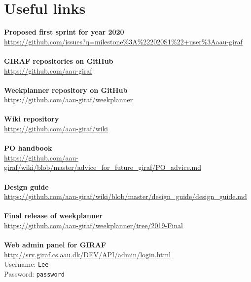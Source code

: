 \newpage
\chapter{Useful links}
\textbf{Proposed first sprint for year 2020} \\
\href{https://github.com/issues?q=milestone%3A%222020S1%22+user%3Aaau-giraf}{https://github.com/issues?q=milestone\%3A\%222020S1\%22+user\%3Aaau-giraf}
\\\\
\textbf{GIRAF repositories on GitHub} \\
\href{https://github.com/aau-giraf}{https://github.com/aau-giraf}
\\\\
\textbf{Weekplanner repository on GitHub} \\
\href{https://github.com/aau-giraf/weekplanner}{https://github.com/aau-giraf/weekplanner}
\\\\
\textbf{Wiki repository} \\
\href{https://github.com/aau-giraf/wiki}{https://github.com/aau-giraf/wiki}
\\\\
\textbf{PO handbook} \\
\href{https://github.com/aau-giraf/wiki/blob/master/advice_for_future_giraf/PO_advice.md}{https://github.com/aau-giraf/wiki/blob/master/advice\_for\_future\_giraf/PO\_advice.md}
\\\\
\textbf{Design guide} \\
\href{https://github.com/aau-giraf/wiki/blob/master/design_guide/design_guide.md}{https://github.com/aau-giraf/wiki/blob/master/design\_guide/design\_guide.md}
\\\\
\textbf{Final release of weekplanner} \\
\href{https://github.com/aau-giraf/weekplanner/tree/2019-Final}{https://github.com/aau-giraf/weekplanner/tree/2019-Final}
\\\\
\textbf{Web admin panel for GIRAF} \\
\href{http://srv.giraf.cs.aau.dk/DEV/API/admin/login.html}{http://srv.giraf.cs.aau.dk/DEV/API/admin/login.html} \\
Username: \texttt{Lee} \\
Password: \texttt{password} \\